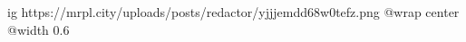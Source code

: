  
 
 
 
 

\ifcmt
  ig https://mrpl.city/uploads/posts/redactor/yjjjemdd68w0tefz.png
  @wrap center
  @width 0.6
\fi
